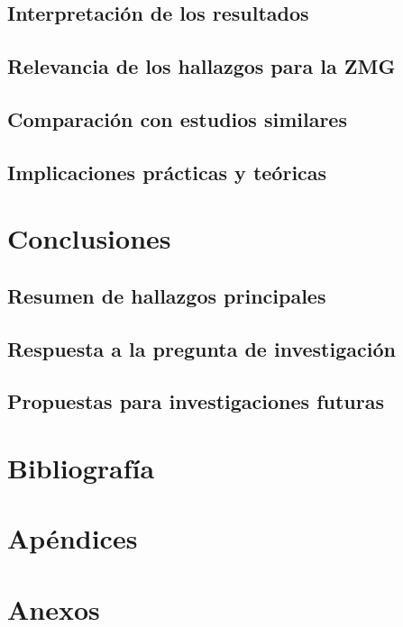 \documentclass[openany]{book}
\begin{document}
	\section{Interpretación de los resultados}
	\section{Relevancia de los hallazgos para la ZMG}
	\section{Comparación con estudios similares}
	\section{Implicaciones prácticas y teóricas}

\chapter{Conclusiones}
	\section{Resumen de hallazgos principales}
	\section{Respuesta a la pregunta de investigación}
	\section{Propuestas para investigaciones futuras}

\chapter{Bibliografía}

\chapter{Apéndices}

\chapter{Anexos}
\end{document}
